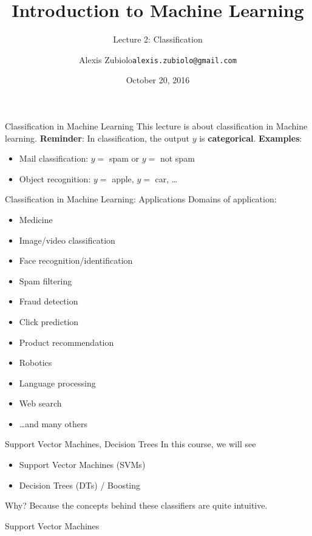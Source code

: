 \documentclass{beamer}
\title[Classification]{Introduction to Machine Learning}
\subtitle{Lecture 2: Classification}
\author{Alexis Zubiolo\newline\texttt{alexis.zubiolo@gmail.com}}
\institute{Data Science Team Lead @ Adcash}
\date{October 20, 2016}
\begin{document}
\begin{frame}
  \titlepage
\end{frame}

\begin{frame}{Classification in Machine Learning}
This lecture is about classification in Machine learning.
\vfill
\textbf{Reminder}: In classification, the output $y$ is \textbf{categorical}.
\vfill
\textbf{Examples}:
\begin{itemize}
	\item Mail classification: $y =$ spam or $y =$ not spam
	\item Object recognition: $y =$ apple, $y =$ car, \ldots
\end{itemize}
\end{frame}

\begin{frame}{Classification in Machine Learning: Applications}
Domains of application:
\begin{itemize}
	\item Medicine
	\item Image/video classification
	\item Face recognition/identification
	\item Spam filtering
	\item Fraud detection
	\item Click prediction
	\item Product recommendation
	\item Robotics
	\item Language processing
	\item Web search
	\item \ldots and many others
\end{itemize}
\end{frame}
%
\begin{frame}{Support Vector Machines, Decision Trees}
In this course, we will see
\begin{itemize}
	\item Support Vector Machines (SVMs)
	\item Decision Trees (DTs) / Boosting
\end{itemize}
\vfill
Why? Because the concepts behind these classifiers are quite intuitive.
\end{frame}
%
\begin{frame}
\begin{center}
\Huge{Support Vector Machines}
\end{center}
\end{frame}
%
\end{document}

